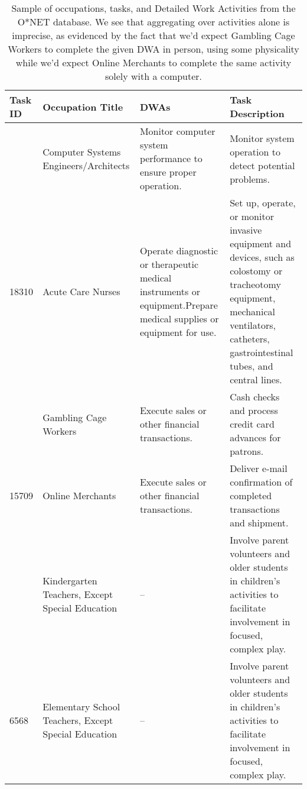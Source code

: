 
\begin{table}\scriptsize \centering
\begin{tabular}{>{\raggedleft\arraybackslash}p{1cm}>{\raggedright\arraybackslash}p{2.4cm}>{\raggedright\arraybackslash}p{4.5cm}>{\raggedright\arraybackslash}p{5.2cm}}
\toprule
\rowcolor{gray!20}
{\raggedright\arraybackslash}\textbf{Task ID}  &  \textbf{Occupation Title}  &  \textbf{DWAs}  &  \textbf{Task Description} \\
\midrule 
14675 & Computer Systems Engineers/Architects & Monitor computer system performance to ensure proper operation. & Monitor system operation to detect potential problems.\\
\rowcolor{gray!10}
18310  &  Acute Care Nurses  &  Operate diagnostic or therapeutic medical instruments or equipment.\newline Prepare medical supplies or equipment for use.   &  Set up, operate, or monitor invasive equipment and devices, such as colostomy or tracheotomy equipment, mechanical ventilators, catheters, gastrointestinal tubes, and central lines.\\ 
4668.0 & Gambling Cage Workers & Execute sales or other financial transactions. & Cash checks and process credit card advances for patrons.\\
\rowcolor{gray!10}
15709  &  Online Merchants  &  Execute sales or other financial transactions.  &  Deliver e-mail confirmation of completed transactions and shipment. \\ 
6529 & Kindergarten Teachers, Except Special Education & -- & Involve parent volunteers and older students in children's activities to facilitate involvement in focused, complex play. \\
\rowcolor{gray!10}

6568 & Elementary School Teachers, Except Special Education & --  & Involve parent volunteers and older students in children's activities to facilitate involvement in focused, complex play. \\  \bottomrule
\end{tabular}
\caption{Sample of occupations, tasks, and Detailed Work Activities from the O*NET database. We see that aggregating over activities alone is imprecise, as evidenced by the fact that we'd expect Gambling Cage Workers to complete the given DWA in person, using some physicality while we'd expect Online Merchants to complete the same activity solely with a computer.}
\label{tab:onet}
\end{table}